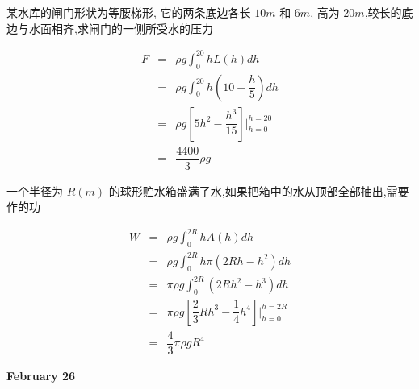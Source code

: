 \begin{example}[][Exam: 28.4.7]
	某水库的闸门形状为等腰梯形, 它的两条底边各长 $10m$ 和 $6m$, 高为 $20m$,较长的底边与水面相齐,求闸门的一侧所受水的压力
\end{example}
\begin{solution}
	\begin{eqnarray*}
		F & = & \rho g\int_{0}^{20}hL(h)dh\\
		  & = & \rho g\int_{0}^{20}h(10-\dfrac{h}{5})dh\\
		  & = & \rho g \left[5h^{2}-\dfrac{h^{3}}{15}\right]\big|_{h=0}^{h=20}\\
		  & = & \dfrac{4400}{3}\rho g
	\end{eqnarray*}
\end{solution}

\begin{example}[][Exam: 28.4.8]
	一个半径为 $R(m)$ 的球形贮水箱盛满了水,如果把箱中的水从顶部全部抽出,需要作的功
\end{example}
\begin{solution}
	\begin{eqnarray*}
		W & = & \rho g\int_{0}^{2R}h A(h)dh\\
		  & = & \rho g\int_{0}^{2R}h\pi (2Rh-h^{2})dh\\
		  & = & \pi \rho g \int_{0}^{2R}(2Rh^{2}-h^{3})dh\\
		  & = & \pi \rho g \left[\dfrac{2}{3}Rh^{3}-\dfrac{1}{4}h^{4}\right]\big|_{h=0}^{h=2R}\\
		  & = & \dfrac{4}{3}\pi \rho g R^{4}
	\end{eqnarray*}
\end{solution}

\textcolor{purplea}{\textbf{February 26}}


